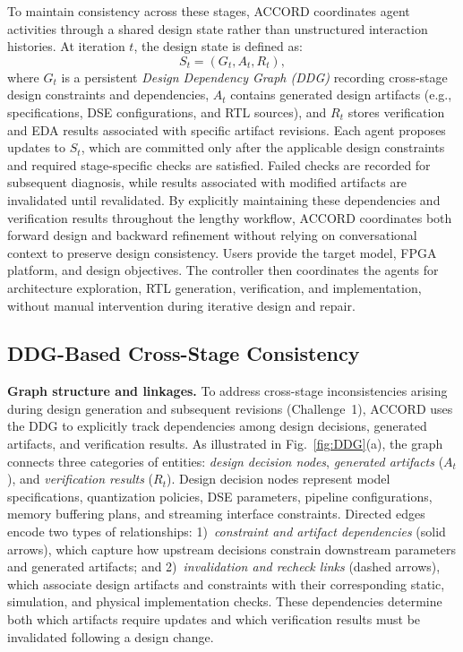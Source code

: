\documentclass[9pt,conference]{IEEEtran}
\begin{document}
To maintain consistency across these stages, ACCORD coordinates agent activities through a shared design state rather than unstructured interaction histories. At iteration $t$, the design state is defined as:
\begin{equation}
S_t = (G_t, A_t, R_t),
\end{equation}
where $G_t$ is a persistent \emph{Design Dependency Graph (DDG)} recording cross-stage design constraints and dependencies, $A_t$ contains generated design artifacts (e.g., specifications, DSE configurations, and RTL sources), and $R_t$ stores verification and EDA results associated with specific artifact revisions. Each agent proposes updates to $S_t$, which are committed only after the applicable design constraints and required stage-specific checks are satisfied. Failed checks are recorded for subsequent diagnosis, while results associated with modified artifacts are invalidated until revalidated. By explicitly maintaining these dependencies and verification results throughout the lengthy workflow, ACCORD coordinates both forward design and backward refinement without relying on conversational context to preserve design consistency. Users provide the target model, FPGA platform,
and design objectives. The controller then
coordinates the agents for architecture exploration,
RTL generation, verification, and implementation,
without manual intervention during iterative
design and repair.

\subsection{DDG-Based Cross-Stage Consistency}
\textbf{Graph structure and linkages.}
To address cross-stage inconsistencies arising during design generation and subsequent revisions (Challenge~1), ACCORD uses the DDG to explicitly track dependencies among design decisions, generated artifacts, and verification results. As illustrated in Fig.~\ref{fig:DDG}(a), the graph connects three categories of entities: \emph{design decision nodes}, \emph{generated artifacts} ($A_t$), and \emph{verification results} ($R_t$). Design decision nodes represent model specifications, quantization policies, DSE parameters, pipeline configurations, memory buffering plans, and streaming interface constraints. Directed edges encode two types of relationships:
1)~\emph{constraint and artifact dependencies} (solid arrows), which capture how upstream decisions constrain downstream parameters and generated artifacts; and
2)~\emph{invalidation and recheck links} (dashed arrows), which associate design artifacts and constraints with their corresponding static, simulation, and physical implementation checks. These dependencies determine both which artifacts require updates and which verification results must be invalidated following a design change.
\end{document}
